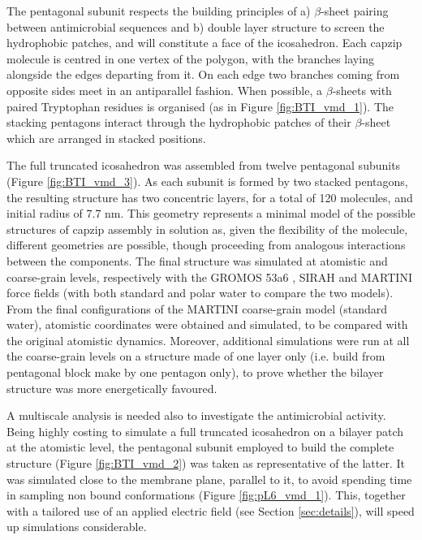 The pentagonal subunit respects the building principles of a) $\beta$-sheet pairing between antimicrobial sequences and b) double layer structure to screen the hydrophobic patches, and will constitute a face of the icosahedron.
%
Each capzip molecule is centred in one vertex of the polygon, with the branches laying alongside the edges departing from it. On each edge two branches coming from opposite sides meet in an antiparallel fashion. When possible, a $\beta$-sheets with paired Tryptophan residues is organised (as in Figure \ref{fig:BTI_vmd_1}). The stacking pentagons interact through the hydrophobic patches of their $\beta$-sheet which are arranged in stacked positions.

The full truncated icosahedron was assembled from twelve pentagonal subunits (Figure \ref{fig:BTI_vmd_3}). As each subunit is formed by two stacked pentagons, the resulting structure has two concentric layers, for a total of 120 molecules, and initial radius of 7.7 nm.
%
This geometry represents a minimal model of the possible structures of capzip assembly in solution as, given the flexibility of the molecule, different geometries are possible, though proceeding from analogous interactions between the components.
%
The final structure was simulated at atomistic and coarse-grain levels, respectively with the GROMOS 53a6 \cite{Oostenbrink2004}, SIRAH \cite{Machado2018} and MARTINI \cite{Marrink2007, Monticelli2008} force fields (with both standard and polar water \cite{Yesylevskyy2010} to compare the two models).
From the final configurations of the MARTINI coarse-grain model (standard water), atomistic coordinates were obtained and simulated, to be compared with the original atomistic dynamics.
%
Moreover, additional simulations were run at all the coarse-grain levels on a structure made of one layer only (i.e. build from pentagonal block make by one pentagon only), to prove whether the bilayer structure was more energetically favoured.

A multiscale analysis is needed also to investigate the antimicrobial activity. Being highly costing to simulate a full truncated icosahedron on a bilayer patch at the atomistic level, the pentagonal subunit employed to build the complete structure (Figure \ref{fig:BTI_vmd_2}) was taken as representative of the latter. It was simulated close to the membrane plane, parallel to it, to avoid spending time in sampling non bound conformations (Figure \ref{fig:pL6_vmd_1}). This, together with a tailored use of an applied electric field (see Section \ref{sec:details}), will speed up simulations considerable.

